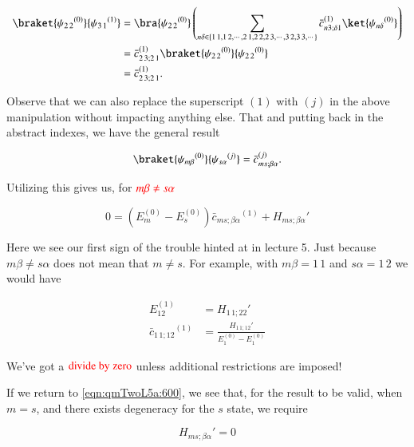 \begin{align*}
\braket{{\psi_{2\,2}}^{(0)}}{{\psi_{3\,1}}^{(1)}} 
&=
\bra{{\psi_{2\,2}}^{(0)}}
\left(
\sum_{n \delta \in \{1\,1, 1\,2, \cdots, 2\,1, 2\,2, 2\,3, \cdots, 3\,2, 3\,3, \cdots \} } {\bar{c}_{n 3; \delta 1}}^{(1)} \ket{{\psi_{n \delta}}^{(0)}}
\right) \\
&=
{\bar{c}_{2\,3 ; 2\,1}}^{(1)} \braket{{\psi_{2\,2}}^{(0)}}{{\psi_{2\,2}}^{(0)}} \\
&=
{\bar{c}_{2\,3; 2\,1}}^{(1)}.
\end{align*}

Observe that we can also replace the superscript $(1)$ with $(j)$ in the above manipulation without impacting anything else.  That and putting back in the abstract indexes, we have the general result

\begin{equation}\label{eqn:qmTwoL5a:580}
\braket{{\psi_{m \beta}}^{(0)}}{{\psi_{s \alpha}}^{(j)}} 
=
{\bar{c}_{ms ; \beta \alpha}}^{(j)}.
\end{equation}

Utilizing this gives us, for $\color{red}{m \beta \ne s \alpha}$

\begin{equation}\label{eqn:qmTwoL5a:600}
0 = 
( E_m^{(0)} - E_s^{(0)}) 
{\bar{c}_{ms ; \beta \alpha}}^{(1)}
+
{H_{ms ; \beta \alpha}}' 
\end{equation}

Here we see our first sign of the trouble hinted at in lecture 5.  Just because $m \beta \ne s \alpha$ does not mean that $m \ne s$.  For example, with $m \beta = 1\,1$ and $s\alpha = 1\,2$ we would have

\begin{align}\label{eqn:qmTwoL5a:620a}
E_{1 2}^{(1)} &= {H_{1\,1 ; 2 2}}' \\
{\bar{c}_{1\,1 ; 1 2}}^{(1)}
&=
\frac{{H_{1\,1 ; 1 2}}' }
{ E_1^{(0)} - E_1^{(0)} }
\end{align}

We've got a $\color{red}{\text{divide by zero}}$ unless additional restrictions are imposed!

If we return to \ref{eqn:qmTwoL5a:600}, we see that, for the result to be valid, when $m = s$, and there exists degeneracy for the $s$ state, we require

\begin{equation}\label{eqn:qmTwoL5a:610}
{H_{ms ; \beta \alpha}}' = 0
\end{equation}


